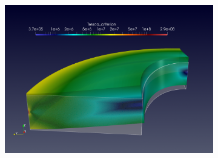 \begin{figure}[h]
\begin{subfigure}[c]{0.49\textwidth}
    \includegraphics[width=\textwidth]{graphics/feelpp/feelpp-benchmark-nafems-le10-solution-tresca-wrap.png}
  \end{subfigure}
  \hfill
  \begin{subfigure}[c]{0.49\textwidth}

  \centering
  \captionsetup[subfigure]{justification=centering}

  \dataTableMeasures
  \def\myLineWidth{2pt}
  \def\myLineStyleA{loosely dashdotdotted} %
  \def\myLineStyleB{dashed}
  \def\myLineStyleC{solid}

  \def\myAddPlot#1#2#3#4{
    \addplot[#3,every mark/.append style={solid},
    x filter/.code={
      \pgfmathparse{\thisrow{PolyOrder}==#2}
      \ifnum0=\pgfmathresult
      \pgfmathsetmacro{\newx}{nan}
    \else
      \pgfmathsetmacro{\newx}{\thisrow{Mesh}}
    \fi
    \pgfmathparse{\newx}
  },
  y filter/.expression={ #4*\pgfmathresult }
  ] table [x=Mesh, y=#1] {\dataTableMeasures};
  }


\end{subfigure}
\end{figure}
